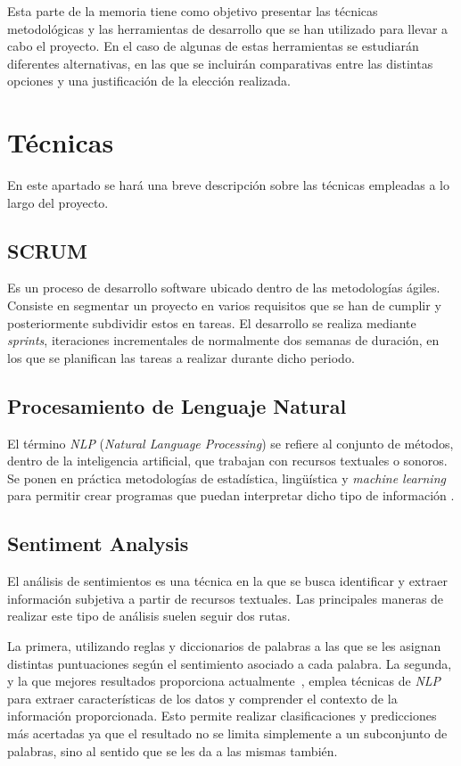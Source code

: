 
Esta parte de la memoria tiene como objetivo presentar las técnicas metodológicas y las herramientas de desarrollo que se han utilizado para llevar a cabo el proyecto. En el caso de algunas de estas herramientas se estudiarán diferentes alternativas, en las que se incluirán comparativas entre las distintas opciones y una justificación de la elección realizada.



\section{Técnicas}

En este apartado se hará una breve descripción sobre las técnicas empleadas a lo largo del proyecto.

\subsection{SCRUM}
Es un proceso de desarrollo software ubicado dentro de las metodologías ágiles. Consiste en segmentar un proyecto en varios requisitos que se han de cumplir y posteriormente subdividir estos en tareas. El desarrollo se realiza mediante \textit{sprints}, iteraciones incrementales de normalmente dos semanas de duración, en los que se planifican las tareas a realizar durante dicho periodo.

\subsection{Procesamiento de Lenguaje Natural}
El término \textit{NLP} (\textit{Natural Language Processing}) se refiere al conjunto de métodos, dentro de la inteligencia artificial, que trabajan con recursos textuales o sonoros. Se ponen en práctica metodologías de estadística, lingüística y \textit{machine learning} para permitir crear programas que puedan interpretar dicho tipo de información \cite{chowdhary2020natural}.

\subsection{Sentiment Analysis}
El análisis de sentimientos es una técnica en la que se busca identificar y extraer información subjetiva a partir de recursos textuales. Las principales maneras de realizar este tipo de análisis suelen seguir dos rutas.

La primera, utilizando reglas y diccionarios de palabras a las que se les asignan distintas puntuaciones según el sentimiento asociado a cada palabra. La segunda, y la que mejores resultados proporciona actualmente~\cite{mishev2020evaluation}, emplea técnicas de \textit{NLP} para extraer características de los datos y comprender el contexto de la información proporcionada. Esto permite realizar clasificaciones y predicciones más acertadas ya que el resultado no se limita simplemente a un subconjunto de palabras, sino al sentido que se les da a las mismas también.

